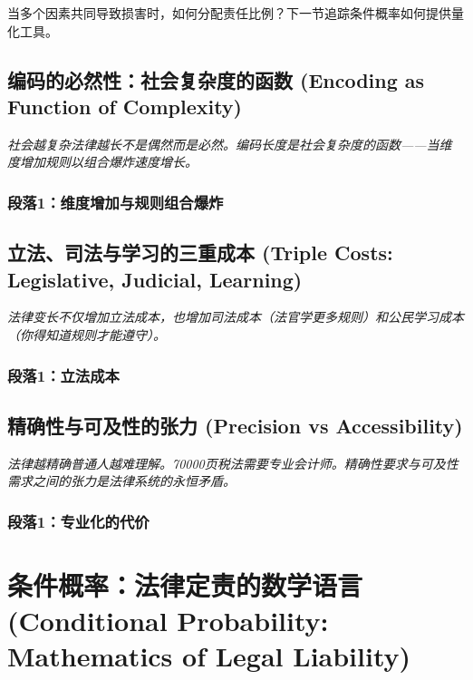 \documentclass[a4paper,12pt]{book}
\newenvironment{motivation}{\begin{tcolorbox}[colback=gray!10,colframe=gray!60,title=\textit{动机}]\small\itshape}{\end{tcolorbox}}
\begin{document}
当多个因素共同导致损害时，如何分配责任比例？下一节追踪条件概率如何提供量化工具。

	\subsection{编码的必然性：社会复杂度的函数 (Encoding as Function of Complexity)}
	\begin{motivation}
		社会越复杂法律越长不是偶然而是必然。编码长度是社会复杂度的函数——当维度增加规则以组合爆炸速度增长。
	\end{motivation}
	\subsubsection*{段落1：维度增加与规则组合爆炸}

	\subsection{立法、司法与学习的三重成本 (Triple Costs: Legislative, Judicial, Learning)}
	\begin{motivation}
		法律变长不仅增加立法成本，也增加司法成本（法官学更多规则）和公民学习成本（你得知道规则才能遵守）。\end{motivation}
	\subsubsection*{段落1：立法成本}

	\subsection{精确性与可及性的张力 (Precision vs Accessibility)}
	\begin{motivation}法律越精确普通人越难理解。70000页税法需要专业会计师。精确性要求与可及性需求之间的张力是法律系统的永恒矛盾。\end{motivation}
	\subsubsection*{段落1：专业化的代价}


	\section{条件概率：法律定责的数学语言 (Conditional Probability: Mathematics of Legal Liability)}
\end{document}
